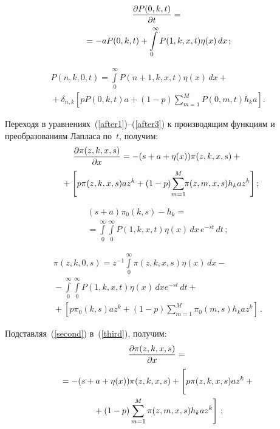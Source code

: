 \begin{multicols}{2}
\vspace*{-14pt}

\noindent
\begin{multline}
\displaystyle\frac{\displaystyle \partial P(0,k,t)\mathstrut}{\displaystyle \partial t\mathstrut}={}\\[-2pt]
{}=-aP(0,k,t)+
\int\limits_0^{\infty}P(1,k,x,t)\eta(x)\,dx\,;\label{after2}
\end{multline}

\vspace*{-14pt}

\noindent
\begin{multline}
P(n,k,0,t)=\int\limits_0^{\infty}P(n+1,k,x,t)\eta(x)\,dx+{}\\[-0.5pt]
{}+\delta_{n,k}\!\left[pP(0,k,t)a+(1-p)\!\sum\limits_{m=1}^{M}
\!\!P(0,m,t)h_k a\right].\!\label{after3}
\end{multline}

Переходя в уравнениях~(\ref{after1})--(\ref{after3}) к производящим
функциям и преобразованиям Лапласа по~$t$, получим:
\begin{multline*}
\fr{\partial \pi(z,k,x,s)}{\partial x}=-(s+a+\eta(x))\pi(z,k,x,s)+{}\\
{}+\left[p\pi(z,k,x,s)az^k+(1-p)\!\sum\limits_{m=1}^{M}\!\!
\pi(z,m,x,s)h_k az^k\right];\hspace*{-6.45119pt} %
\end{multline*}

\vspace*{-12pt}

\noindent
\begin{multline}
(s+a)\pi_0(k,s)-h_k={}\\
{}=\int\limits_0^{\infty}\int\limits_0^{\infty}
P(1,k,x,t)\eta(x)\,dx\, e^{-st}\,dt\,;\label{second}
\end{multline}

\vspace*{-12pt}

\noindent
\begin{multline}
\pi(z,k,0,s)=z^{-1}\int\limits_0^{\infty}\pi(z,k,x,s)
\eta(x)\,dx-{}\\
{}-\int\limits_0^{\infty}\int\limits_0^{\infty}
P(1,k,x,t)\eta(x)\,dx e^{-st}\,dt+{}\\
{}+\left[p\pi_0(k,s)az^k+(1-p)\sum\limits_{m=1}^{M}\pi_0(m,s)h_k az^k\right]\,.
\label{third}
\end{multline}

Подставляя~(\ref{second}) в~(\ref{third}), получим:
\begin{multline}
\fr{\partial \pi(z,k,x,s)}{\partial x}={}\\
{}=-(s+a+\eta(x))\pi(z,k,x,s)+
\left[\vphantom{\sum\limits_{m=1}^{M}}
p\pi(z,k,x,s)az^k+{}\right.\\
\left.{}+(1-p)\sum\limits_{m=1}^{M}\pi(z,m,x,s)h_k az^k\right]\,;
\label{newfirst}
\end{multline}


\end{multicols}

